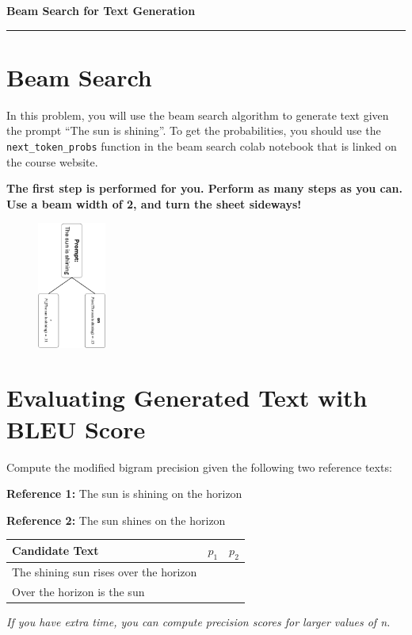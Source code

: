 \documentclass{article}
\newcommand{\worksheetname}{Beam Search for Text Generation}
\begin{document}
{\Large\textbf{\worksheetname}}\\\rule{\linewidth}{0.5mm}

\section{Beam Search}
In this problem, you will use the beam search algorithm to generate text given the prompt ``The sun is shining''. To get the probabilities, you should use the \texttt{next\_token\_probs} function in the beam search colab notebook that is linked on the course website.

\textbf{The first step is performed for you. Perform as many steps as you can. Use a beam width of 2, and turn the sheet sideways!}
\begin{figure}[H]
    \centering
\includegraphics[width=0.2\textwidth]{img/beam_search.png}
\end{figure}

\newpage
\section{Evaluating Generated Text with BLEU Score}
Compute the modified bigram precision given the following two reference texts:

\textbf{Reference 1:} The sun is shining on the horizon

\textbf{Reference 2:} The sun shines on the horizon



\begin{table}[H]
    \LARGE
    \centering
    \begin{tabular}{|l|p{1in}|p{1in}|} \hline 
         Candidate Text&  $p_1$& $p_2$\\ \hline 
         The shining sun rises over the horizon& & \\ \hline 
         Over the horizon is the sun&  & \\ \hline
    \end{tabular}
\end{table}

\textit{If you have extra time, you can compute precision scores for larger values of n.}
\end{document}
